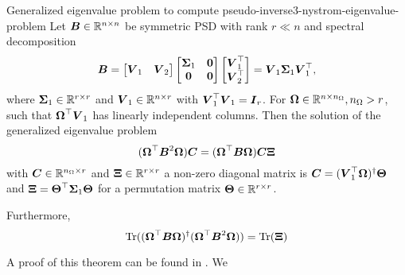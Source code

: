 \begin{theorem}{Generalized eigenvalue problem to compute pseudo-inverse}{3-nystrom-eigenvalue-problem}
    Let $\boldsymbol{B} \in \mathbb{R}^{n \times n}$ be symmetric \gls{PSD} with rank $r \ll n$ and
    spectral decomposition 
    \begin{equation}
        \boldsymbol{B}
        = \begin{bmatrix} \boldsymbol{V}_1 & \boldsymbol{V}_2 \end{bmatrix} 
          \begin{bmatrix} \boldsymbol{\Sigma}_1 & \boldsymbol{0} \\ \boldsymbol{0} & \boldsymbol{0} \end{bmatrix} 
          \begin{bmatrix} \boldsymbol{V}_1^{\top} \\ \boldsymbol{V}_2^{\top} \end{bmatrix}
        = \boldsymbol{V}_1 \boldsymbol{\Sigma}_1 \boldsymbol{V}_1^{\top},
        \label{equ:3-nystrom-eigenvalue-problem-spectral-decomposition}
    \end{equation}
    where $\boldsymbol{\Sigma}_1 \in \mathbb{R}^{r \times r}$ and
    $\boldsymbol{V}_1 \in \mathbb{R}^{n \times r}$ with $\boldsymbol{V}_1^{\top} \boldsymbol{V}_1 = \boldsymbol{I}_r$.
    For $\boldsymbol{\Omega} \in \mathbb{R}^{n \times n_{\Omega}}, n_{\Omega} > r$,
    such that $\boldsymbol{\Omega}^{\top} \boldsymbol{V}_1$ has linearly independent columns.
    Then the solution of the generalized eigenvalue problem
    \begin{equation}
        (\boldsymbol{\Omega}^{\top} \boldsymbol{B}^2 \boldsymbol{\Omega}) \boldsymbol{C} = (\boldsymbol{\Omega}^{\top} \boldsymbol{B} \boldsymbol{\Omega}) \boldsymbol{C}  \boldsymbol{\Xi}
        \label{equ:3-nystrom-low-rank-eigenvalue-problem}
    \end{equation}
    with $\boldsymbol{C} \in \mathbb{R}^{n_{\Omega} \times r}$ and $\boldsymbol{\Xi} \in \mathbb{R}^{r \times r}$ a 
    non-zero diagonal matrix is $\boldsymbol{C} = (\boldsymbol{V}_1^{\top} \boldsymbol{\Omega})^{\dagger} \boldsymbol{\Theta}$
    and $\boldsymbol{\Xi} = \boldsymbol{\Theta}^{\top} \boldsymbol{\Sigma}_1 \boldsymbol{\Theta}$
    for a permutation matrix $\boldsymbol{\Theta} \in \mathbb{R}^{r \times r}$.

    Furthermore,
    \begin{equation}
        \operatorname{Tr}((\boldsymbol{\Omega}^{\top} \boldsymbol{B} \boldsymbol{\Omega})^{\dagger}(\boldsymbol{\Omega}^{\top} \boldsymbol{B}^2 \boldsymbol{\Omega})) = \operatorname{Tr}(\boldsymbol{\Xi})
        \label{equ:3-nystrom-low-rank-trace-equalities}
    \end{equation}
\end{theorem}
A proof of this theorem can be found in \cite[theorem~3]{lin2017randomized}. We

